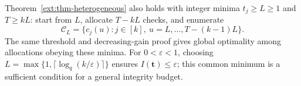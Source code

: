 Theorem~\ref{ext:thm-heterogeneous} also holds with integer minima
$t_j\ge L\ge1$ and $T\ge kL$: start from $L$, allocate $T-kL$ checks, and enumerate
\[
 \mathcal C_L=\{c_j(u):j\in[k],\ u=L,\ldots,T-(k-1)L\}.
\]
The same threshold and decreasing-gain proof gives global optimality
among allocations obeying these minima.
For $0<\varepsilon<1$, choosing
$L=\max\{1,\lceil\log_q(k/\varepsilon)\rceil\}$ ensures
$I(\mathbf t)\le\varepsilon$; this common minimum is a sufficient
condition for a general integrity budget.
